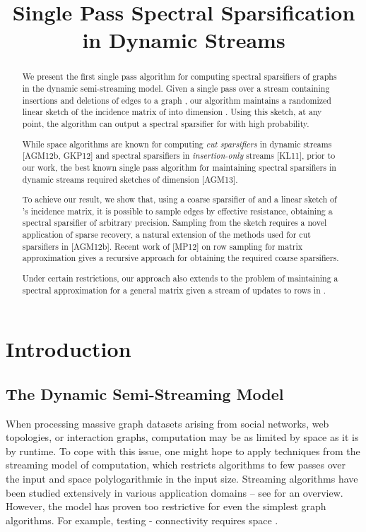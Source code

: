 \documentclass[11pt]{article}
\title{Single Pass Spectral Sparsification in Dynamic Streams}
\author{\and\and
Michael Kapralov\\MIT\\ {kapralov@mit.edu}
\and
Yin Tat Lee\\MIT\\ {yintat@mit.edu}
\and
Cameron Musco\\MIT\\ {cnmusco@mit.edu}
\and\and
Christopher Musco\\MIT\\ {cpmusco@mit.edu}
\and
Aaron Sidford\\MIT\\ {sidford@mit.edu}
}
\date{}
\begin{document}
\maketitle
\begin{abstract}
We present the first single pass algorithm for computing spectral sparsifiers of graphs in the dynamic semi-streaming model. Given a single pass over a stream containing insertions and deletions of edges to a graph , our algorithm maintains a randomized linear sketch of the incidence matrix of  into dimension .
Using this sketch, at any point, the algorithm can output a  spectral sparsifier for  with high probability. 

While  space algorithms are known for computing \emph{cut sparsifiers} in dynamic streams [AGM12b, GKP12] and spectral sparsifiers in \emph{insertion-only} streams [KL11], prior to our work, the best known single pass algorithm for maintaining spectral sparsifiers in dynamic streams required sketches  of dimension  [AGM13].

To achieve our result, we show that, using a coarse sparsifier of   and a linear sketch of 's incidence matrix, it is possible to sample edges by effective resistance,  obtaining a spectral sparsifier of arbitrary precision. Sampling from the sketch requires a novel application of  sparse recovery, a natural extension of the  methods used for cut sparsifiers in [AGM12b]. Recent work of [MP12] on row sampling for matrix approximation gives a recursive approach for obtaining the required coarse sparsifiers. 

Under certain restrictions, our approach also extends to the problem of maintaining a spectral approximation for a general matrix  given a stream of updates to rows in .

\end{abstract}
\thispagestyle{empty}


\clearpage
\setcounter{page}{1}

\section{Introduction}
\subsection{The Dynamic Semi-Streaming Model}
When processing massive graph datasets arising from social networks, web topologies, or interaction graphs, computation may be as limited by space as it is by runtime. To cope with this issue, one might hope to apply techniques
from the streaming model of computation, which restricts algorithms to few passes over the input and space polylogarithmic in the input size. Streaming algorithms
have been studied extensively in various application domains -- see \cite{muthukrishnan2005data} for an overview. However, the model has proven too restrictive for even the
simplest graph algorithms. For example, testing - connectivity requires
 space \cite{henz:lb}. 
\end{document}
